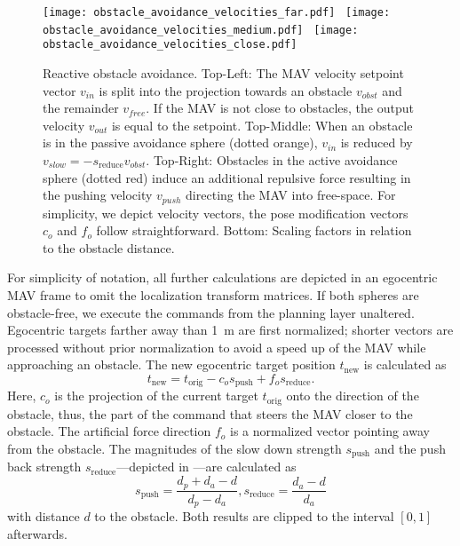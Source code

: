 \begin{figure}[t]
  \centering
  \texttt{[image: obstacle\_avoidance\_velocities\_far.pdf]}~
  \texttt{[image: obstacle\_avoidance\_velocities\_medium.pdf]}~
  \texttt{[image: obstacle\_avoidance\_velocities\_close.pdf]}\\[2ex]

  \resizebox{0.8\linewidth}{!}{
  
  }
  \vspace{-2ex}
  \caption{Reactive obstacle avoidance. Top-Left: The MAV velocity setpoint vector $v_{in}$ is split into the projection towards an obstacle $v_{obst}$ and the remainder $v_{free}$. If the MAV is not close to obstacles, the output velocity $v_{out}$ is equal to the setpoint. Top-Middle: When an obstacle is in the passive avoidance sphere (dotted orange), $v_{in}$ is reduced by $v_{slow} = -s_\mathrm{reduce} v_{obst}$. Top-Right: Obstacles in the active avoidance sphere (dotted red) induce an additional repulsive force resulting in the pushing velocity $v_{push}$ directing the MAV into free-space. For simplicity, we depict velocity vectors, the pose modification vectors $c_o$ and $f_o$ follow straightforward. Bottom: Scaling factors in relation to the obstacle distance.}
  \label{fig:obst-avoidance-vectors}
  \vspace{-2ex}
\end{figure}

For simplicity of notation, all further calculations are depicted in an egocentric MAV frame to omit the localization transform matrices.
If both spheres are obstacle-free, we execute the commands from the planning layer unaltered.
Egocentric targets farther away than \SI{1}{\meter} are first normalized; shorter vectors are processed without prior normalization to avoid a speed up of the MAV while approaching an obstacle.
The new egocentric target position $t_{\textrm{new}}$ is calculated as
\begin{equation*}
  t_{\textrm{new}} = t_{\textrm{orig}} - c_o s_\mathrm{push} + f_o s_\mathrm{reduce}.
\end{equation*}
Here, $c_o$ is the projection of the current target $t_{\textrm{orig}}$ onto the direction of the obstacle, thus, the part of the command that steers the MAV closer to the obstacle.
The artificial force direction $f_o$ is a normalized vector pointing away from the obstacle.
The magnitudes of the slow down strength $s_\mathrm{push}$ and the push back strength $s_\mathrm{reduce}$---depicted in ---are calculated as
\begin{equation*}
  s_\mathrm{push} = \frac{d_p + d_a - d}{d_p - d_a}, s_\mathrm{reduce} = \frac{d_a - d}{d_a}
\end{equation*}
with distance $d$ to the obstacle. Both results are clipped to the interval $[0,1]$ afterwards.


